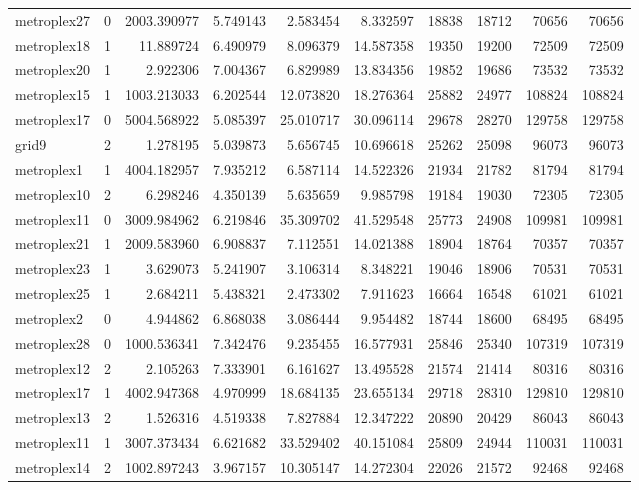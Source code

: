 \begin{longtable}{|l|r|r|r|r|r|r|r|r|r|}
metroplex27 & 0 & 2003.390977 & 5.749143 & 2.583454 & 8.332597 & 18838 & 18712 & 70656 & 70656 \\
metroplex18 & 1 & 11.889724 & 6.490979 & 8.096379 & 14.587358 & 19350 & 19200 & 72509 & 72509 \\
metroplex20 & 1 & 2.922306 & 7.004367 & 6.829989 & 13.834356 & 19852 & 19686 & 73532 & 73532 \\
metroplex15 & 1 & 1003.213033 & 6.202544 & 12.073820 & 18.276364 & 25882 & 24977 & 108824 & 108824 \\
metroplex17 & 0 & 5004.568922 & 5.085397 & 25.010717 & 30.096114 & 29678 & 28270 & 129758 & 129758 \\
grid9 & 2 & 1.278195 & 5.039873 & 5.656745 & 10.696618 & 25262 & 25098 & 96073 & 96073 \\
metroplex1 & 1 & 4004.182957 & 7.935212 & 6.587114 & 14.522326 & 21934 & 21782 & 81794 & 81794 \\
metroplex10 & 2 & 6.298246 & 4.350139 & 5.635659 & 9.985798 & 19184 & 19030 & 72305 & 72305 \\
metroplex11 & 0 & 3009.984962 & 6.219846 & 35.309702 & 41.529548 & 25773 & 24908 & 109981 & 109981 \\
metroplex21 & 1 & 2009.583960 & 6.908837 & 7.112551 & 14.021388 & 18904 & 18764 & 70357 & 70357 \\
metroplex23 & 1 & 3.629073 & 5.241907 & 3.106314 & 8.348221 & 19046 & 18906 & 70531 & 70531 \\
metroplex25 & 1 & 2.684211 & 5.438321 & 2.473302 & 7.911623 & 16664 & 16548 & 61021 & 61021 \\
metroplex2 & 0 & 4.944862 & 6.868038 & 3.086444 & 9.954482 & 18744 & 18600 & 68495 & 68495 \\
metroplex28 & 0 & 1000.536341 & 7.342476 & 9.235455 & 16.577931 & 25846 & 25340 & 107319 & 107319 \\
metroplex12 & 2 & 2.105263 & 7.333901 & 6.161627 & 13.495528 & 21574 & 21414 & 80316 & 80316 \\
metroplex17 & 1 & 4002.947368 & 4.970999 & 18.684135 & 23.655134 & 29718 & 28310 & 129810 & 129810 \\
metroplex13 & 2 & 1.526316 & 4.519338 & 7.827884 & 12.347222 & 20890 & 20429 & 86043 & 86043 \\
metroplex11 & 1 & 3007.373434 & 6.621682 & 33.529402 & 40.151084 & 25809 & 24944 & 110031 & 110031 \\
metroplex14 & 2 & 1002.897243 & 3.967157 & 10.305147 & 14.272304 & 22026 & 21572 & 92468 & 92468 \\

\end{longtable}
